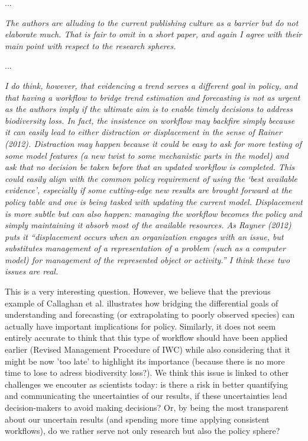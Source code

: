 \documentclass[11pt,letter]{article}
\begin{document}
...

\begin{mybox}
\emph{The authors are alluding to the current publishing culture as a barrier but do not elaborate
much. That is fair to omit in a short paper, and again I agree with their main point with respect to the research spheres.}
\end{mybox}

...

\begin{mybox}
\emph{I do think, however, that evidencing a trend serves a different goal in
policy, and that having a workflow to bridge trend estimation and forecasting is not as urgent
as the authors imply if the ultimate aim is to enable timely decisions to address biodiversity
loss. In fact, the insistence on workflow may backfire simply because it can easily lead to either
distraction or displacement in the sense of Rainer (2012). Distraction may happen because it
could be easy to ask for more testing of some model features (a new twist to some mechanistic
parts in the model) and ask that no decision be taken before that an updated workflow is
completed. This could easily align with the common policy requirement of using the ‘best
available evidence’, especially if some cutting-edge new results are brought forward at the
policy table and one is being tasked with updating the current model. Displacement is more
subtle but can also happen: managing the workflow becomes the policy and simply
maintaining it absorb most of the available resources. As Rayner (2012) puts it “displacement
occurs when an organization engages with an issue, but substitutes management of a
representation of a problem (such as a computer model) for management of the represented
object or activity.” I think these two issues are real.} 
\end{mybox}

This is a very interesting question. However, we believe that the previous example of Callaghan et al. illustrates how bridging the differential goals of understanding and forecasting (or extrapolating to poorly observed species) can actually have important implications for policy. Similarly, it does not seem entirely accurate to think that this type of workflow should have been applied earlier (Revised Management Procedure of IWC) while also considering that it might be now 'too late' to highlight its importance (because there is no more time to lose to adress biodiversity loss?). We think this issue is linked to other challenges we encouter as scientists today: is there a risk in better quantifying and communicating the uncertainties of our results, if these uncertainties lead decision-makers to avoid making decisions? Or, by being the most transparent about our uncertain results (and spending more time applying consistent workflows), do we rather serve not only research but also the policy sphere?
\end{document}
